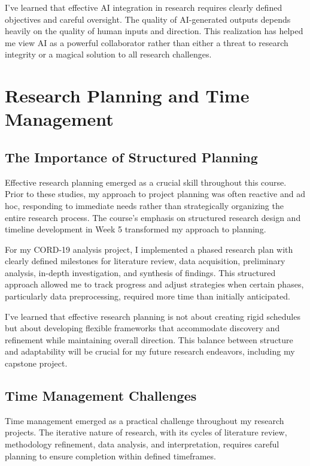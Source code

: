 \documentclass[
]{article}
\begin{document}
I've learned that effective AI integration in research requires clearly
defined objectives and careful oversight. The quality of AI-generated
outputs depends heavily on the quality of human inputs and direction.
This realization has helped me view AI as a powerful collaborator rather
than either a threat to research integrity or a magical solution to all
research challenges.

\section{Research Planning and Time
Management}\label{research-planning-and-time-management}

\subsection{The Importance of Structured
Planning}\label{the-importance-of-structured-planning}

Effective research planning emerged as a crucial skill throughout this
course. Prior to these studies, my approach to project planning was
often reactive and ad hoc, responding to immediate needs rather than
strategically organizing the entire research process. The course's
emphasis on structured research design and timeline development in Week
5 transformed my approach to planning.

For my CORD-19 analysis project, I implemented a phased research plan
with clearly defined milestones for literature review, data acquisition,
preliminary analysis, in-depth investigation, and synthesis of findings.
This structured approach allowed me to track progress and adjust
strategies when certain phases, particularly data preprocessing,
required more time than initially anticipated.

I've learned that effective research planning is not about creating
rigid schedules but about developing flexible frameworks that
accommodate discovery and refinement while maintaining overall
direction. This balance between structure and adaptability will be
crucial for my future research endeavors, including my capstone project.

\subsection{Time Management
Challenges}\label{time-management-challenges}

Time management emerged as a practical challenge throughout my research
projects. The iterative nature of research, with its cycles of
literature review, methodology refinement, data analysis, and
interpretation, requires careful planning to ensure completion within
defined timeframes.
\end{document}

